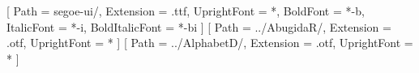 \setmainfont{segoe-ui}[
	Path = segoe-ui/,
	Extension = .ttf,
	UprightFont = *,
	BoldFont = *-b,
	ItalicFont = *-i,
	BoldItalicFont = *-bi
]
\newfontfamily{}[
	Path = ../AbugidaR/,
	Extension = .otf,
	UprightFont = *
]
\newfontfamily{}[
	Path = ../AlphabetD/,
	Extension = .otf,
	UprightFont = *
]
\makeglossaries

